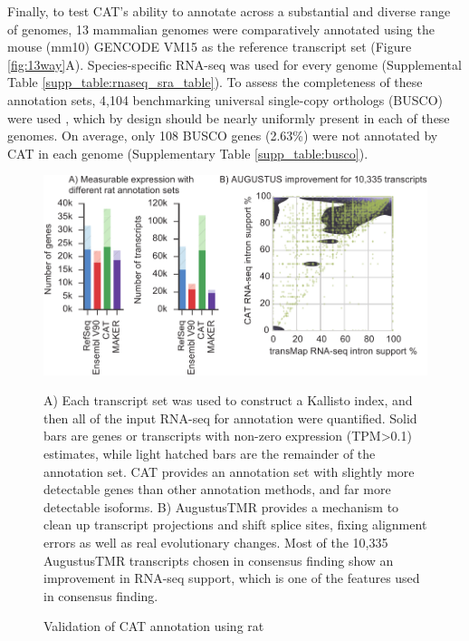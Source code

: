 \documentclass[fleqn,10pt]{wlscirep}
\begin{document}
Finally, to test CAT's ability to annotate across a substantial and diverse range of genomes, 13 mammalian genomes were comparatively annotated using the mouse (mm10) GENCODE VM15 as the reference transcript set (Figure \ref{fig:13way}A). Species-specific RNA-seq was used for every genome (Supplemental Table \ref{supp_table:rnaseq_sra_table}). To assess the completeness of these annotation sets, 4,104 benchmarking universal single-copy orthologs (BUSCO) were used \cite{simao2015busco}, which by design should be nearly uniformly present in each of these genomes. On average, only 108 BUSCO genes (2.63\%) were not annotated by CAT in each genome (Supplementary Table \ref{supp_table:busco}). 


\begin{figure}
\centering
\includegraphics[width=\textwidth,height=\textheight,keepaspectratio]{figure5-rat_v18.pdf}
\caption{Validation of CAT annotation using rat}
A) Each transcript set was used to construct a Kallisto \cite{bray2015near} index, and then all of the input RNA-seq for annotation were quantified. Solid bars are genes or transcripts with non-zero expression (TPM\textgreater 0.1) estimates, while light hatched bars are the remainder of the annotation set. CAT provides an annotation set with slightly more detectable genes than other annotation methods, and far more detectable isoforms. B) AugustusTMR provides a mechanism to clean up transcript projections and shift splice sites, fixing alignment errors as well as real evolutionary changes. Most of the 10,335 AugustusTMR transcripts chosen in consensus finding show an improvement in RNA-seq support, which is one of the features used in consensus finding.
\label{fig:rat_validation}
\end{figure}
\end{document}
